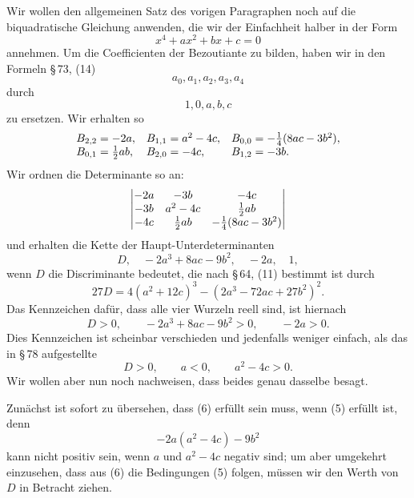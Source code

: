 \documentclass[11pt]{article}
\begin{document}
Wir wollen den allgemeinen Satz des vorigen Paragraphen noch auf die biquadratische Gleichung anwenden, die wir der Einfachheit halber in der Form
\begin{equation}
        x^4+ax^2+bx+c=0
\tag{2}
\end{equation}
annehmen. Um die Coefficienten der Bezoutiante zu bilden, haben wir in den Formeln \S\,73, (14)
\[
        a_0,a_1,a_2,a_3,a_4
\]
durch
\[
        1,0,a,b,c
\]
zu ersetzen. Wir erhalten so
\[
\begin{array}{lll}
 B_{2,2}=-2a, & B_{1,1}=a^2-4c, & B_{0,0}=-\frac14(8ac-3b^2),\cr
 B_{0,1}=\frac12ab, & B_{2,0}=-4c, & B_{1,2}=-3b.
\end{array}
\]
Wir ordnen die Determinante so an:
\[
\begin{vmatrix}
 -2a&-3b&-4c\cr
 -3b&a^2-4c&\frac12ab\cr
 -4c&\frac12ab&-\frac14(8ac-3b^2)
\end{vmatrix}
\]
und erhalten die Kette der Haupt-Unterdeterminanten
\begin{equation}
        D,
        \quad -2a^3+8ac-9b^2,
        \quad -2a,
        \quad 1,
\tag{3}
\end{equation}
wenn $D$ die Discriminante bedeutet, die nach \S\,64, (11) bestimmt ist durch
\begin{equation}
        27D=4(a^2+12c)^3-(2a^3-72ac+27b^2)^2.
\tag{4}
\end{equation}
Das Kennzeichen daf\"ur, dass alle vier Wurzeln reell sind, ist hiernach
\begin{equation}
        D>0,
        \qquad -2a^3+8ac-9b^2>0,
        \qquad -2a>0.
\tag{5}
\end{equation}
Dies Kennzeichen ist scheinbar verschieden und jedenfalls weniger einfach, als das in \S\,78 aufgestellte
\begin{equation}
        D>0,
        \qquad a<0,
        \qquad a^2-4c>0.
\tag{6}
\end{equation}
Wir wollen aber nun noch nachweisen, dass beides genau dasselbe besagt.

Zun\"achst ist sofort zu \"ubersehen, dass (6) erf\"ullt sein muss, wenn (5) erf\"ullt ist, denn
\[
        -2a(a^2-4c)-9b^2
\]
kann nicht positiv sein, wenn $a$ und $a^2-4c$ negativ sind; um aber umgekehrt einzusehen, dass aus (6) die Bedingungen (5) folgen, m\"ussen wir den Werth von $D$ in Betracht ziehen.
\end{document}
